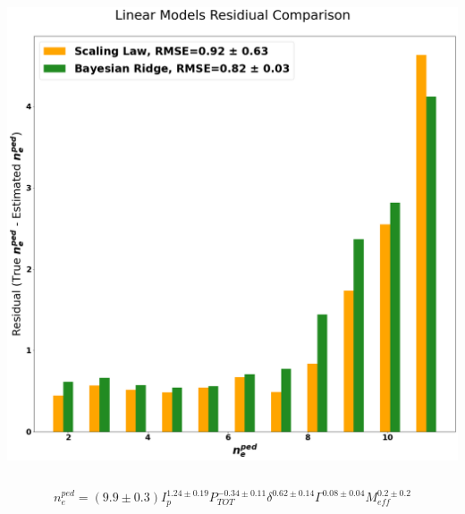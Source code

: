 \documentclass{beamer}
\begin{document}
\begin{frame}
\begin{block}{}
\begin{columns}
\includegraphics[scale=0.14]{../src/linear_comp}
\end{columns}
\end{block}
\begin{equation}
	n_e^{ped} = (9.9 \pm 0.3) I_p^{1.24 \pm 0.19} P_{TOT}^{-0.34 \pm 0.11} \delta^{0.62 \pm 0.14} \Gamma^{ 0.08 \pm 0.04} M_{eff}^{0.2 \pm 0.2}
\end{equation}

\end{frame}
\end{document}
